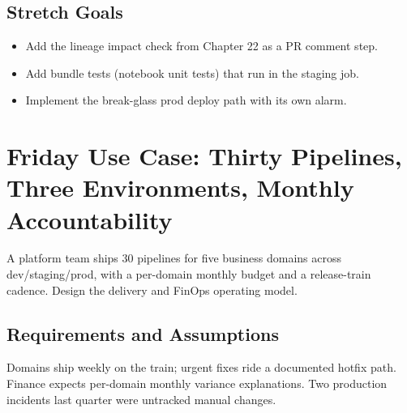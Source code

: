 \subsection*{Stretch Goals}
\begin{itemize}
    \item Add the lineage impact check from Chapter 22 as a PR comment step.
    \item Add bundle tests (notebook unit tests) that run in the staging job.
    \item Implement the break-glass prod deploy path with its own alarm.
\end{itemize}

\section{Friday Use Case: Thirty Pipelines, Three Environments, Monthly Accountability}
A platform team ships 30 pipelines for five business domains across dev/staging/prod, with a per-domain monthly budget and a release-train cadence. Design the delivery and FinOps operating model.

\subsection{Requirements and Assumptions}
Domains ship weekly on the train; urgent fixes ride a documented hotfix path. Finance expects per-domain monthly variance explanations. Two production incidents last quarter were untracked manual changes.

